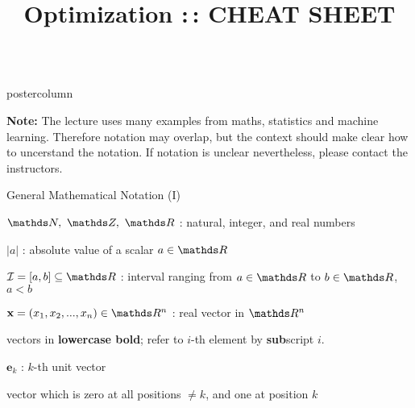 \documentclass[11pt,compress,t,notes=noshow, xcolor=table]{beamer}
\title{Optimization :\,: CHEAT SHEET} %
\newlength{\columnheight} %
\begin{document}
\begin{frame}[fragile]{}
\begin{columns}
	\begin{column}{.31\textwidth}
		\begin{beamercolorbox}[center]{postercolumn}
			\begin{minipage}{.98\textwidth}
				\parbox[t][\columnheight]{\textwidth}{
					\vspace{1cm}
					\textbf{Note: } The lecture uses many examples from maths, statistics and machine learning. Therefore notation may overlap, but the context should make clear how to uncerstand the notation. 
					If notation is unclear nevertheless, please contact the instructors.
					\begin{myblock}{General Mathematical Notation (I)}
						\begin{codebox}
							$\N, ~\Z, ~\R$ : natural, integer, and real numbers
						\end{codebox}
						\hspace*{1ex}%
						\begin{codebox}
						    $|a|$ : absolute value of a scalar $a \in \R$
						\end{codebox}
						\hspace*{1ex}
						\begin{codebox}
							 $\mathcal{I} = [a, b] \subseteq \R$ : interval ranging from $a \in \R$ to $b \in \R$, $a < b$
						\end{codebox}
						\hspace*{1ex}
						\begin{codebox}
						    $\xv = (x_1, x_2, ..., x_n) \in \R^n$ :  real vector in $\R^n$ %
						\end{codebox}
						\hspace*{1ex} vectors in \textbf{lowercase bold}; refer to $i$-th element by \textbf{sub}script $i$.
						\\
						\begin{codebox}
							$\mathbf{e}_k$ : $k$-th unit vector
						\end{codebox}
						\hspace*{1ex} vector which is zero at all positions $\neq k$, and one at position $k$ \\

\end{myblock}}
\end{minipage}
\end{beamercolorbox}
\end{column}
\end{columns}
\end{frame}
\end{document}

